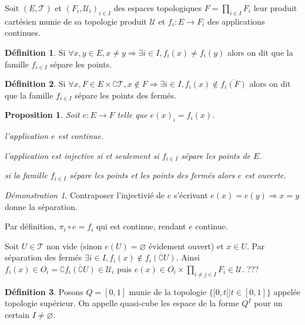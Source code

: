 \documentclass[a4paper, 11pt, french]{book}
\newenvironment{itemise}{\itemize}{\enditemize}
\theoremstyle{plain} %
\newtheorem{proposition}{Proposition}
\theoremstyle{definition} %
\newtheorem{definition}{Définition}
\theoremstyle{remark} %
\newtheorem*{demonstration}{Démonstration}
\newcommand{\1}{\mathds{1}}
\newcommand\vide{\varnothing}
\begin{document}
Soit $(E, \mathscr{T})$ et $(F_i, \mathscr{U}_i)_{i\in I}$ des espaces topologiques $F=\prod_{i\in I}F_i$ leur produit cartésien munie de sa topologie produit $\mathscr{U}$ et $f_i:E\rightarrow F_i$ des applications continues.

\begin{definition}
	Si $\forall x, y\in E, x\neq y\Rightarrow\exists i\in I, f_i(x)\neq f_i(y)$ alors on dit que la famille $f_{i\in I}$ sépare les points.
\end{definition}

\begin{definition}
	Si $\forall x, F\in E\times\complement\mathscr{T}, x\notin F\Rightarrow\exists i\in I, f_i(x)\notin\overline{f_i(F)}$ alors on dit que la famille $f_{i\in I}$ sépare les points des fermés.
\end{definition}

\begin{proposition}
	Soit $e:E\rightarrow F$ telle que $e(x)_i=f_i(x)$.
	\begin{itemise}
		\item l'application $e$ est continue.
		\item l'application est injective si et seulement si $f_{i\in I}$ sépare les points de $E$.
		\item si la famille $f_{i\in I}$ sépare les points et les points des fermés alors $e$ est ouverte.
	\end{itemise}
\end{proposition}

\begin{demonstration}
	\begin{itemise}
		\item Contraposer l'injectivié de $e$ s'écrivant $e(x)=e(y)\Rightarrow x=y$ donne la séparation.
		\item Par définition, $\pi_i\circ e=f_i$  qui est continue, rendant $e$ continue.
		\item Soit $U\in\mathscr{T}$ non vide (sinon $e(U)=\vide$ évidement ouvert) et $x\in U$.
		Par séparation des fermés $\exists i\in I, f_i(x)\notin\overline{f_i(\complement U)}$.
		Ainsi $f_i(x)\in O_i=\complement\overline{f_i(\complement U)}\in\mathscr{U}_i$ puis $e(x)\in O_i\times\prod_{i\neq j\in I}F_i\in\mathscr{U}$.
		{\color{red} ???}
	\end{itemise}
\end{demonstration}

\begin{definition}
	Posons $Q=[0, 1]$ munie de la topologie $\{[0, t[|t\in[0, 1]\}$ appelée topologie supérieur.
	On appelle quasi-cube les espace de la forme $Q^I$ pour un certain $I\neq\vide$.
\end{definition}
\end{document}
